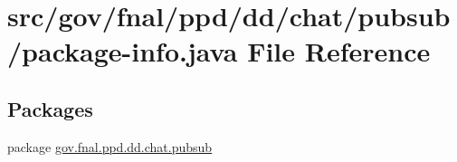 \hypertarget{gov_2fnal_2ppd_2dd_2chat_2pubsub_2package-info_8java}{\section{src/gov/fnal/ppd/dd/chat/pubsub/package-\/info.java File Reference}
\label{gov_2fnal_2ppd_2dd_2chat_2pubsub_2package-info_8java}
}
\subsection*{Packages}
\begin{DoxyCompactItemize}
\item 
package \hyperlink{namespacegov_1_1fnal_1_1ppd_1_1dd_1_1chat_1_1pubsub}{gov.\-fnal.\-ppd.\-dd.\-chat.\-pubsub}
\end{DoxyCompactItemize}
